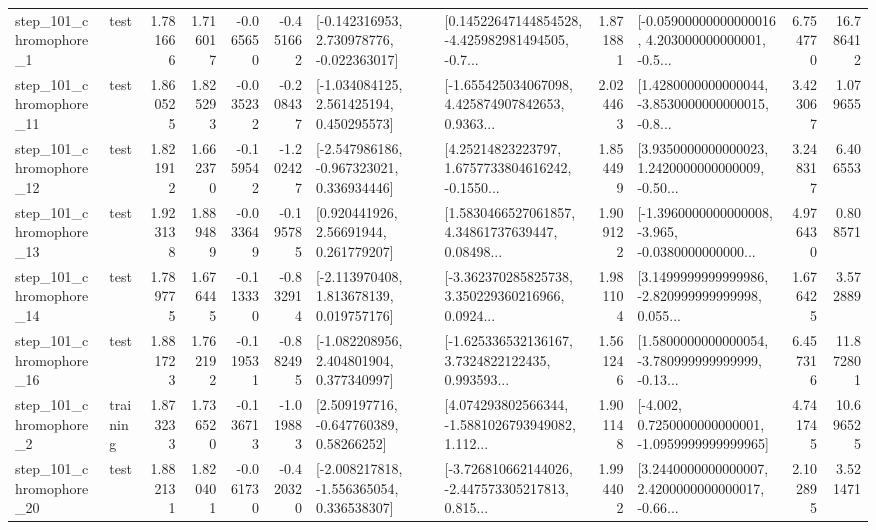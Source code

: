 \begin{tabular}{llrrrrllrlrr}
   step\_101\_chromophore\_1 &      test &      1.781666 &    1.716017 &     -0.065650 & -0.451662 &   [-0.142316953, 2.730978776, -0.022363017] &  [0.14522647144854528, -4.425982981494505, -0.7... &       1.871881 &  [-0.05900000000000016, 4.203000000000001, -0.5... &            6.754770 &         16.786412 \\
  step\_101\_chromophore\_11 &      test &      1.860525 &    1.825293 &     -0.035232 & -0.208437 &    [-1.034084125, 2.561425194, 0.450295573] &  [-1.655425034067098, 4.425874907842653, 0.9363... &       2.024463 &  [1.4280000000000044, -3.8530000000000015, -0.8... &            3.423067 &          1.079655 \\
  step\_101\_chromophore\_12 &      test &      1.821912 &    1.662370 &     -0.159542 & -1.202427 &   [-2.547986186, -0.967323021, 0.336934446] &  [4.25214823223797, 1.6757733804616242, -0.1550... &       1.854499 &  [3.9350000000000023, 1.2420000000000009, -0.50... &            3.248317 &          6.406553 \\
  step\_101\_chromophore\_13 &      test &      1.923138 &    1.889489 &     -0.033649 & -0.195785 &      [0.920441926, 2.56691944, 0.261779207] &  [1.5830466527061857, 4.34861737639447, 0.08498... &       1.909122 &  [-1.3960000000000008, -3.965, -0.0380000000000... &            4.976430 &          0.808571 \\
  step\_101\_chromophore\_14 &      test &      1.789775 &    1.676445 &     -0.113330 & -0.832914 &    [-2.113970408, 1.813678139, 0.019757176] &  [-3.362370285825738, 3.350229360216966, 0.0924... &       1.981104 &  [3.1499999999999986, -2.820999999999998, 0.055... &            1.676425 &          3.572889 \\
  step\_101\_chromophore\_16 &      test &      1.881723 &    1.762192 &     -0.119531 & -0.882495 &    [-1.082208956, 2.404801904, 0.377340997] &  [-1.625336532136167, 3.7324822122435, 0.993593... &       1.561246 &  [1.5800000000000054, -3.780999999999999, -0.13... &            6.457316 &         11.872801 \\
   step\_101\_chromophore\_2 &  training &      1.873233 &    1.736520 &     -0.136713 & -1.019883 &     [2.509197716, -0.647760389, 0.58266252] &  [4.074293802566344, -1.5881026793949082, 1.112... &       1.901148 &  [-4.002, 0.7250000000000001, -1.0959999999999965] &            4.741745 &         10.696525 \\
  step\_101\_chromophore\_20 &      test &      1.882131 &    1.820401 &     -0.061730 & -0.420320 &   [-2.008217818, -1.556365054, 0.336538307] &  [-3.726810662144026, -2.447573305217813, 0.815... &       1.994402 &  [3.2440000000000007, 2.4200000000000017, -0.66... &            2.102895 &          3.521471 \\

\end{tabular}
